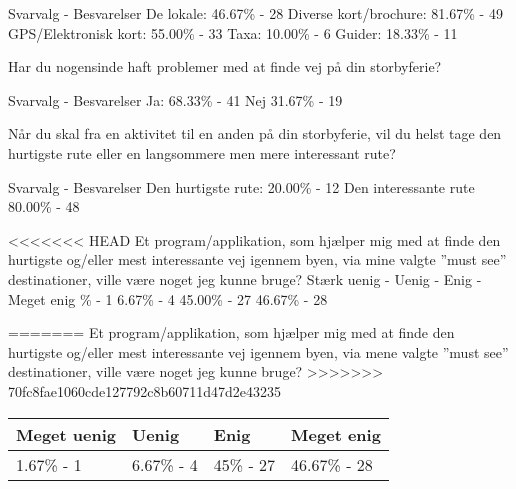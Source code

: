 Svarvalg - Besvarelser\newline
De lokale:
46.67\%  -  28 \newline
Diverse kort/brochure:
81.67\%  -  49 \newline
GPS/Elektronisk kort:
55.00\%  -  33 \newline
Taxa:
10.00\%  -   6 \newline
Guider:
18.33\% - 11 \newline


Har du nogensinde haft problemer med at finde vej på din storbyferie?

Svarvalg - Besvarelser \newline
Ja: 
68.33\%  -  41 \newline
Nej
31.67\%  -  19

Når du skal fra en aktivitet til en anden på din storbyferie, vil du helst tage den hurtigste rute eller en langsommere men mere interessant rute?

Svarvalg - Besvarelser \newline
Den hurtigste rute:
20.00\%  -  12 \newline
Den interessante rute
80.00\%  -  48 

<<<<<<< HEAD
Et program/applikation, som hjælper mig med at finde den hurtigste og/eller mest interessante vej igennem byen, via mine valgte ”must see” destinationer, ville være noget jeg kunne bruge? \newline
Stærk uenig   -    Uenig    -     Enig    -    Meget enig \%  -  1
6.67\%  -  4
45.00\%  -  27
46.67\%  -  28

=======
Et program/applikation, som hjælper mig med at finde den hurtigste og/eller mest interessante vej igennem byen, via mene valgte ”must see” destinationer, ville være noget jeg kunne bruge? \newline
>>>>>>> 70fc8fae1060cde127792c8b60711d47d2e43235

\begin{center}
	\begin{tabular}{| l | l | l | l |}
    \hline
    Meget uenig & Uenig & Enig & Meget enig \\ \hline
    1.67\% - 1 & 6.67\% - 4 & 45\% - 27 & 46.67\% - 28 \\
    \hline
    \end{tabular}
\end{center}
